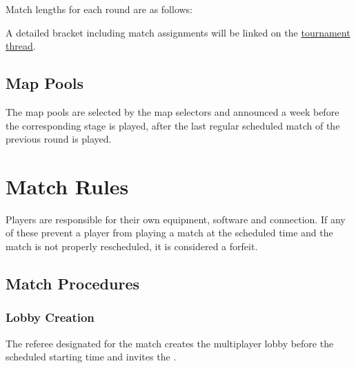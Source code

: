 \begin{samepage}
Match lengths for each round are as follows:
\matchlengths
\end{samepage}

\custombracketpost

A detailed bracket including match assignments will be linked on the \href{\thread}{tournament thread}.

\subsection{Map Pools}


\custommappool

The map pools are selected by the map selectors and announced a week before the corresponding stage is played, after the last regular scheduled match of the previous round is played.

\section{Match Rules}

Players are responsible for their own equipment, software and connection. If any of these prevent a player from playing a match at the scheduled time and the match is not properly rescheduled, it is considered a forfeit.

\subsection{Match Procedures}

\subsubsection{Lobby Creation}
The referee designated for the match creates the multiplayer lobby \lobbyopen{} before the scheduled starting time and invites the .


